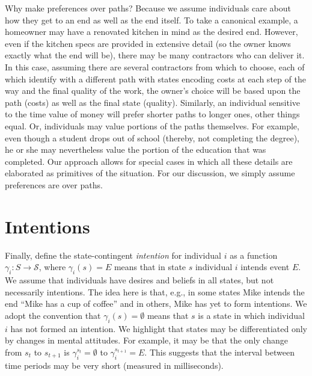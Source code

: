 \documentclass[
11pt,
titlepage,
reqno,
]{article}%
\theoremstyle{definition}
\begin{document}
	Why make preferences over paths? Because we assume individuals care about how they get to an end as well as the end itself. 
	To take a canonical example, a homeowner may have a renovated kitchen in mind as the desired end. 
	However, even if the kitchen specs are provided in extensive detail (so the owner knows exactly what the end will be), there may be many contractors who can deliver it. 
	In this case, assuming there are several contractors from which to choose, each of which identify with a different path with states encoding costs  at each step of the way and the final quality of the work, the owner's choice will be based upon the path (costs) as well as the final state (quality). 
	Similarly, an individual sensitive to the time value of money will prefer shorter paths to longer ones, other things equal. 
	Or, individuals may value portions of the paths themselves.
	For example, even though a student drops out of school (thereby, not completing the degree), he or she may nevertheless value the portion of the education that was completed. 
	Our approach allows for special cases in which all these details are elaborated as primitives of the situation. For our discussion, we simply assume preferences are over paths.    %
	
	
\section{Intentions} \label{sec: intentions}
	
	Finally, define the state-contingent \textit{intention} for individual $i$ as a function $\gamma_i:S\rightarrow \mathcal{S}$, where $\gamma_i(s)=E$ means that in state $s$ individual $i$ intends event $E$. 
	We assume that individuals have desires and beliefs in all states, but not necessarily intentions. 
	The idea here is that, e.g., in some states Mike intends the end ``Mike has a cup of coffee'' and in others, Mike has yet to form intentions.
	We adopt the convention that $\gamma_i(s)=\emptyset$ means that $s$ is a state in which individual $i$ has not formed an intention. 
	We highlight that states may be differentiated only by changes in mental attitudes. 
	For example, it may be that the only change from $s_t$ to $s_{t+1}$ is $\gamma_i^{s_t}=\emptyset$ to $\gamma_i^{s_{t+1}}=E$.
	This suggests that the interval between time periods may be very short (measured in milliseconds).
	
\end{document}
